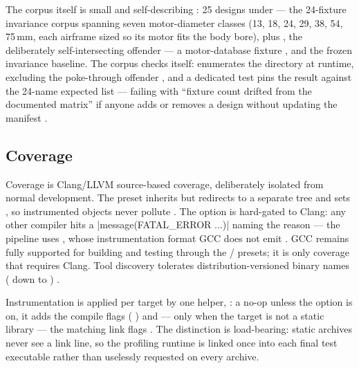 The corpus itself is small and self-describing : 25
 designs under  --- the 24-fixture invariance corpus
spanning seven motor-diameter classes (13, 18, 24, 29, 38, 54, 75\,mm, each airframe
sized so its motor fits the body bore), plus , the
deliberately self-intersecting offender --- a motor-database fixture
, and the frozen invariance baseline. The corpus checks
itself:  enumerates the directory at runtime, excluding the
poke-through offender , and a dedicated test pins
the result against the 24-name expected list --- failing with ``fixture count drifted
from the documented matrix'' if anyone adds or removes a design without updating the
manifest .

\subsection{Coverage}\label{sec:testing-coverage}

Coverage is Clang/LLVM source-based coverage, deliberately isolated from normal
development. The  preset inherits  but redirects
to a separate  tree and sets 
, so instrumented objects never pollute . The
option is hard-gated to Clang: any other compiler hits a
\cppinline|message(FATAL_ERROR ...)| naming the reason --- the pipeline uses
, whose instrumentation format GCC does not emit
. GCC remains fully supported for building and testing through
the / presets; it is only coverage that requires
Clang. Tool discovery tolerates distribution-versioned binary names
( down to ) .

Instrumentation is applied per target by one helper, 
: a no-op unless the option is on, it adds the compile flags
( )
and --- only when the target is not a static library --- the matching link flags
. The distinction is load-bearing: static archives never see a
link line, so the profiling runtime is linked once into each final test executable
rather than uselessly requested on every archive.


